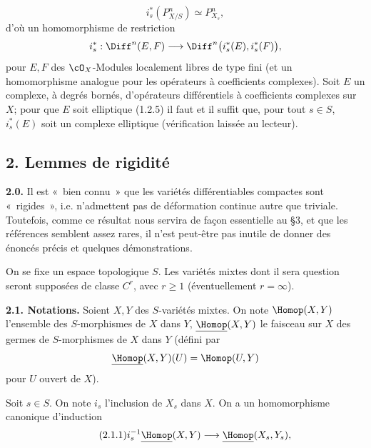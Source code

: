 \[
  i_s^*(P^n_{X/S})\simeq P^n_{X_s},
\]
d'où un
homomorphisme de restriction
\[
  i_s^*:\Diff^n(E,F)
  \longrightarrow
  \Diff^n\bigl(i_s^*(E),i_s^*(F)\bigr),
\]
pour $E,F$ des $\cO_X$-Modules localement libres de type fini (et un homomorphisme analogue pour les opérateurs à coefficients complexes). Soit $E$ un complexe, à degrés bornés, d'opérateurs différentiels à coefficients complexes sur $X$; pour que $E$ soit elliptique (1.2.5) il faut et il suffit que, pour tout $s\in S$, $i_s^*(E)$ soit un complexe elliptique (vérification laissée au lecteur).

\subsection*{2. Lemmes de rigidité}

\textbf{2.0.} Il est «~bien connu~» que les variétés différentiables compactes sont «~rigides~», i.e. n'admettent pas de déformation continue autre que triviale. Toutefois, comme ce résultat nous servira de façon essentielle au §3, et que les références semblent assez rares, il n'est peut-être pas inutile de donner des énoncés précis et quelques démonstrations.

On se fixe un espace topologique $S$. Les variétés mixtes dont il sera question seront supposées de classe $C^r$, avec $r\ge1$ (éventuellement $r=\infty$).

\textbf{2.1. Notations.} Soient $X,Y$ des $S$-variétés mixtes. On note $\Homop(X,Y)$ l'ensemble des $S$-morphismes de $X$ dans $Y$, $\underline{\Homop}(X,Y)$ le faisceau sur $X$ des germes de $S$-morphismes de $X$ dans $Y$ (défini par
\[
  \underline{\Homop}(X,Y)(U)=\Homop(U,Y)
\]
pour $U$ ouvert de $X$).

Soit $s\in S$. On note $i_s$ l'inclusion de $X_s$ dans $X$. On a un homomorphisme canonique d'induction
\begin{equation}\tag{2.1.1}
  i_s^{-1}\underline{\Homop}(X,Y)
  \longrightarrow
  \underline{\Homop}(X_s,Y_s),
\end{equation}
